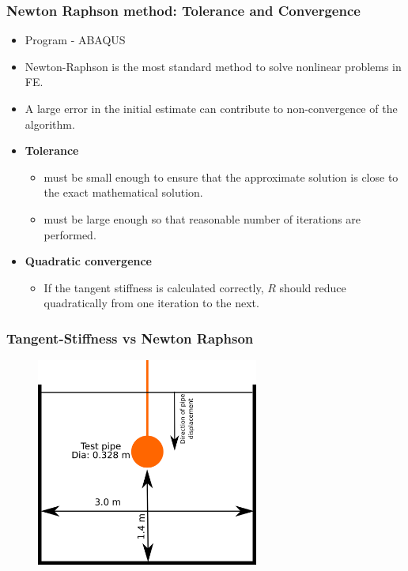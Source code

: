 \documentclass[notes]{beamer}
\begin{document}


\begin{frame}
\frametitle{Newton Raphson method: Tolerance and Convergence}
\begin{itemize}
	\item Program - ABAQUS
	\item Newton-Raphson is the most standard method to solve nonlinear problems in FE.
	\item A large error in the initial estimate can contribute to non-convergence of the algorithm.
	\item \textbf{Tolerance}
	\begin{itemize}
		\item must be small enough to ensure that the approximate
		solution is close to the exact mathematical solution.
		\item must be large enough so that reasonable number of
		iterations are performed.
	\end{itemize}
	\item \textbf{Quadratic convergence}
	\begin{itemize}
		\item If the tangent stiffness is calculated correctly, $R$ should
		reduce quadratically from one iteration to the next.
	\end{itemize}
\end{itemize}
\end{frame}

\begin{frame}
\frametitle{Tangent-Stiffness vs Newton Raphson}
\begin{figure}[ht]
	\centering
	\includegraphics[width=0.65\textwidth]{figs/pipe-comparison-nr-tangent-stiffness.png}
\end{figure}
\end{frame}
\end{document}
